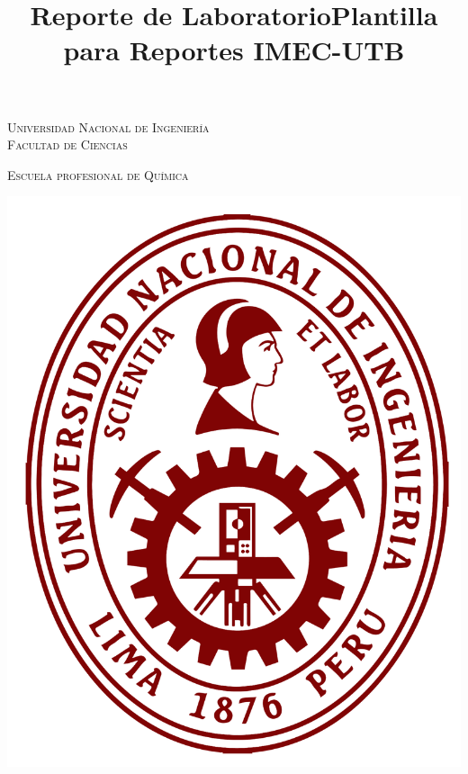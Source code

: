 \documentclass[10pt]{article}
\title{Reporte de Laboratorio}
\title{Plantilla para Reportes IMEC-UTB}
\begin{document}
\begin{center}																		%
\newcommand{\HRule}{\rule{\linewidth}{0.5mm}}									%

\hspace{0.9cm}

\textsc{\huge Universidad Nacional de Ingeniería }\\[0.8cm]
			
\textsc{\LARGE Facultad de Ciencias}

\vspace{0.5cm}

\textsc{\Large Escuela profesional de Química}

\vspace{0.6cm}


\includegraphics[scale = 0.15]{Imagenes/UNI.png}
	
\vspace*{0.6cm}							


\end{center}
\end{document}
